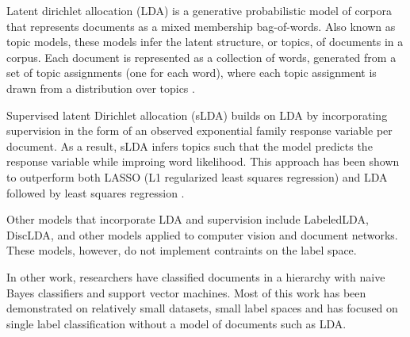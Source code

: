 Latent dirichlet allocation (LDA) is a generative
probabilistic model of corpora that represents documents as a mixed
membership bag-of-words. Also known as topic models, these models
infer the latent structure, or topics, of documents in a corpus. Each
document is represented as a collection of words, generated from a
set of topic assignments (one for each word), where each topic assignment
is drawn from a distribution over topics \citep{Blei2003}.

Supervised latent Dirichlet allocation (sLDA) builds on LDA by incorporating
supervision in the form of an observed exponential family response 
variable per document. As a result, sLDA
infers topics such that the model predicts the response variable while
improing word likelihood.  This approach has been shown to outperform both LASSO
(L1 regularized least squares regression) and LDA followed by least
squares regression \citep{BleiMcAuliffe2008}.

Other models that incorporate LDA and supervision include
LabeledLDA\citep{Ramage2009}, DiscLDA\citep{DiscLDA}, and other models applied to 
computer vision and document networks\citep{wangbleifeifei08,RelationalLDA}. 
These models, however, do not implement contraints on the label space.

In other work, researchers have classified documents in a hierarchy with naive Bayes classifiers
and support vector machines. Most of this work has been demonstrated on relatively
small datasets, small label spaces and has focused on single label classification without
a model of documents such as LDA\citep{mccallum99building,Dumais2000HCW,Kollerilprints291,Chakrabarti1998SFS}.


